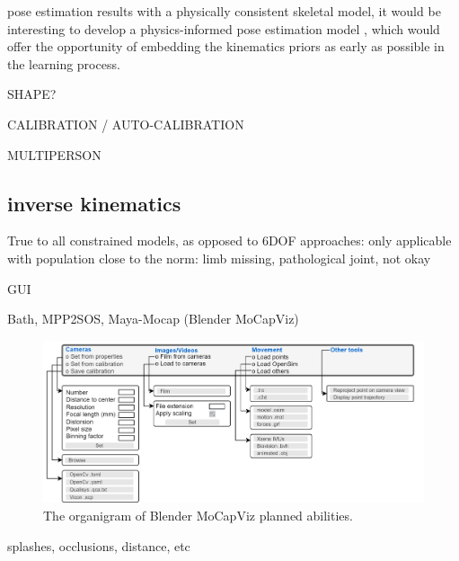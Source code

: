 pose estimation results with a physically consistent skeletal model, it would be interesting to develop a physics-informed pose estimation model \cite{Raissi2019}, which would offer the opportunity of embedding the kinematics priors as early as possible in the learning process.


SHAPE?

CALIBRATION / AUTO-CALIBRATION

MULTIPERSON

\subsection{inverse kinematics}
True to all constrained models, as opposed to 6DOF approaches: only applicable with population close to the norm: limb missing, pathological joint, not okay


GUI

Bath, MPP2SOS, Maya-Mocap (Blender MoCapViz)


\begin{figure}[hbtp]
      \centering
      \def\svgwidth{1\columnwidth}
      \fontsize{10pt}{10pt}\selectfont
      \includegraphics[width=\linewidth]{"../Chap3/Figures/Fig_MayaMocap3.png"}
      \caption{The organigram of Blender MoCapViz planned abilities.}
      \label{fig_blendermocap}
\end{figure}


splashes, occlusions, distance, etc